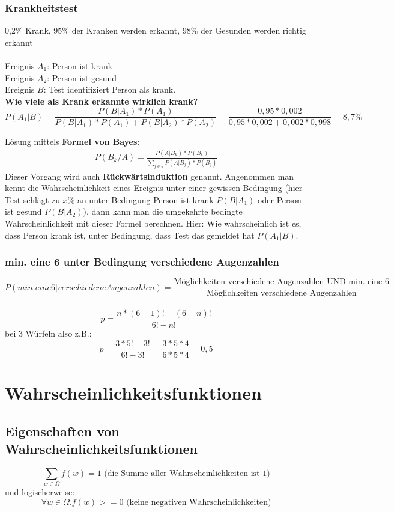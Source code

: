 \documentclass{article}
\begin{document}
\subsubsection{Krankheitstest}
0,2\% Krank, 95\% der Kranken werden erkannt, 98\% der Gesunden werden richtig erkannt\\ \\
Ereignis $A_1$: Person ist krank\\
Ereignis $A_2$: Person ist gesund\\
Ereignis $B$: Test identifiziert Person als krank.\\

\textbf{Wie viele als Krank erkannte wirklich krank?}\\
\[
	P(A_1 | B ) = \frac{P(B|A_1)*P(A_1)}
	{P(B|A_1)*P(A_1)+P(B| A_2)*P(A_2)} =
	\frac{0,95*0,002}{0,95*0,002+0,002*0,998} = 8,7\%
\]

\vspace*{10pt}

L\"osung mittels \textbf{Formel von Bayes}:
\begin{align}
	P(B_k/A) = \frac{P(A|B_k) * P(B_k)}{\sum_{j \in J} P(A|B_j) * P(B_j)}
\end{align}
Dieser Vorgang wird auch \textbf{R\"uckw\"artsinduktion} genannt. Angenommen man
kennt die Wahrscheinlichkeit eines Ereignis unter einer gewissen Bedingung (hier Test
schl\"agt zu $x\%$ an unter Bedingung Person ist krank $P(B|A_1)$ oder Person ist gesund
$P(B|A_2)$), dann kann man die umgekehrte bedingte Wahrscheinlichkeit
mit dieser Formel berechnen. Hier: Wie wahrscheinlich ist es, dass Person krank ist, unter
Bedingung, dass Test das gemeldet hat $P(A_1|B)$.

\subsubsection{min. eine 6 unter Bedingung verschiedene Augenzahlen}
\[
	P(min. eine 6|verschiedene Augenzahlen) = \frac{\text{M\"oglichkeiten verschiedene Augenzahlen
	UND min. eine 6}}{\text{M\"oglichkeiten verschiedene Augenzahlen}}
\]\\
\[
	p=\frac{n*(6-1)!-(6-n)!}{6!-n!} 
\]
bei 3 W\"urfeln also z.B.:\[
	p=\frac{3*5!-3!}{6!-3!} = \frac{3*5*4}{6*5*4} = 0,5
\]

\section{Wahrscheinlichkeitsfunktionen}
\subsection{Eigenschaften von Wahrscheinlichkeitsfunktionen}
\[ \sum_{w \in \Omega} f(w) = 1 \text{ (die Summe aller Wahrscheinlichkeiten ist 1)}\]
und logischerweise:
\[ \forall w\in\Omega . f(w)>=0 \text{ (keine negativen Wahrscheinlichkeiten)} \]
\end{document}
